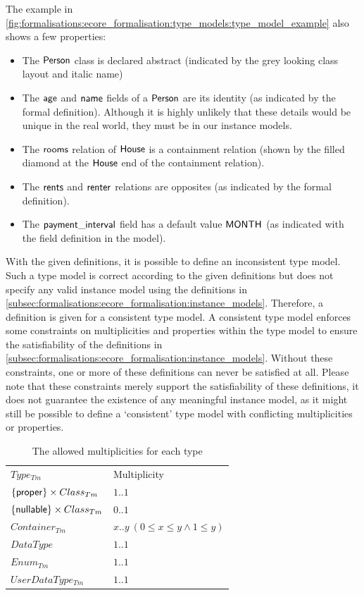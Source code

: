 The example in \cref{fig:formalisations:ecore_formalisation:type_models:type_model_example} also shows a few properties:
\begin{itemize}
    \item The $\mathsf{Person}$ class is declared abstract (indicated by the grey looking class layout and italic name)
    \item The $\mathsf{age}$ and $\mathsf{name}$ fields of a $\mathsf{Person}$ are its identity (as indicated by the formal definition). Although it is highly unlikely that these details would be unique in the real world, they must be in our instance models.
    \item The $\mathsf{rooms}$ relation of $\mathsf{House}$ is a containment relation (shown by the filled diamond at the $\mathsf{House}$ end of the containment relation).
    \item The $\mathsf{rents}$ and $\mathsf{renter}$ relations are opposites (as indicated by the formal definition).
    \item The $\mathsf{payment\_interval}$ field has a default value $\mathsf{MONTH}$ (as indicated with the field definition in the model).
\end{itemize}

With the given definitions, it is possible to define an inconsistent type model. Such a type model is correct according to the given definitions but does not specify any valid instance model using the definitions in \cref{subsec:formalisations:ecore_formalisation:instance_models}. Therefore, a definition is given for a consistent type model. A consistent type model enforces some constraints on multiplicities and properties within the type model to ensure the satisfiability of the definitions in \cref{subsec:formalisations:ecore_formalisation:instance_models}. Without these constraints, one or more of these definitions can never be satisfied at all. Please note that these constraints merely support the satisfiability of these definitions, it does not guarantee the existence of any meaningful instance model, as it might still be possible to define a `consistent' type model with conflicting multiplicities or properties.

\begin{table}[t]
    \centering
    \begin{tabular}{l|l}
        \rowcolor{gray!50}
        $Type_{Tm}$ & Multiplicity\\
        $\{ \mathsf{proper} \} \times Class_{Tm}$ & $1..1$\\
        $\{ \mathsf{nullable} \} \times Class_{Tm}$ & $0..1$\\
        $Container_{Tm}$ & $x..y \: (0 \leq x \leq y \land 1 \leq y)$\\
        $DataType$ & $1..1$\\
        $Enum_{Tm}$ & $1..1$\\
        $UserDataType_{Tm}$ & $1..1$
    \end{tabular}
    \caption{The allowed multiplicities for each type}
    \label{tab:formalisations:ecore_formalisation:type_models:possible_multiplicities}
\end{table}

